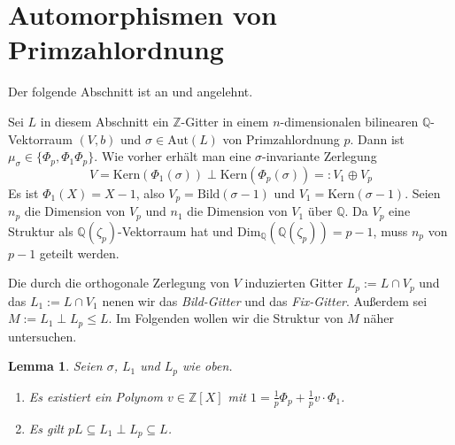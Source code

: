 \documentclass[12pt,a4paper,halfparskip,headsepline,bibtotocnumbered]{scrreprt}
\theoremstyle{nummermitklammern}
\newtheorem{lemma}[defsatzusw]{Lemma}
\theoremstyle{nonumberbreak}
\newcommand{\Z}{\mathbb{Z}}
\newcommand{\Q}{\mathbb{Q}}
\newcommand{\Kern}{\text{Kern}}
\newcommand{\Bild}{\text{Bild}}
\newcommand{\Aut}{\text{Aut}}
\begin{document}
\section{Automorphismen von Primzahlordnung}
Der folgende Abschnitt ist an \cite[Kap. 4]{juergens} und \cite[Kap. 4]{nebe} angelehnt.\par
Sei $L$ in diesem Abschnitt ein $\Z$-Gitter in einem $n$-dimensionalen bilinearen $\Q$-Vektorraum $(V,b)$ und $\sigma \in \Aut(L)$ von Primzahlordnung $p$. Dann ist $\mu_\sigma \in \lbrace \Phi_p, \Phi_1 \Phi_p \rbrace$. Wie vorher erhält man eine $\sigma$-invariante Zerlegung
\begin{equation*}
	V = \Kern(\Phi_1(\sigma)) \perp \Kern(\Phi_p(\sigma)) =: V_1 \oplus V_p
\end{equation*}
Es ist $\Phi_1(X) = X-1$, also $V_p = \Bild(\sigma - 1)$ und $V_1 = \Kern(\sigma - 1)$. Seien $n_p$ die Dimension von $V_p$ und $n_1$ die Dimension von $V_1$ über $\Q$. Da $V_p$ eine Struktur als $\Q(\zeta_p)$-Vektorraum hat und $\text{Dim}_\Q(\Q(\zeta_p)) = p-1$, muss $n_p$ von $p-1$ geteilt werden.\par

Die durch die orthogonale Zerlegung von $V$ induzierten Gitter $L_p := L \cap V_p$ und das $L_1 := L \cap V_1$ nenen wir das \textit{Bild-Gitter} und das \textit{Fix-Gitter}. Außerdem sei\linebreak
$M := L_1 \perp L_p \leq L$. Im Folgenden wollen wir die Struktur von $M$ näher untersuchen.

\begin{framed}
	\begin{lemma}\label{lem:pL}
		Seien $\sigma$, $L_1$ und $L_p$ wie oben.
		\begin{enumerate}[label=(\roman*)]
			\item Es existiert ein Polynom $v \in \Z\left[ X \right]$ mit $1 = \frac{1}{p}\Phi_p + \frac{1}{p} v \cdot \Phi_1$.
			\item Es gilt $pL \subseteq L_1 \perp L_p \subseteq L$.
		\end{enumerate}
	\end{lemma}
\end{framed}
\end{document}
